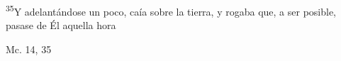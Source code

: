 \documentclass[../../rosario.tex]{subfiles}
\begin{document}
    \textsuperscript{35}Y adelantándose un poco, caía sobre la tierra, y rogaba que, a ser posible, pasase de Él aquella hora
    \begin{flushright}
    Mc. 14, 35  
    \end{flushright}
\end{document}
